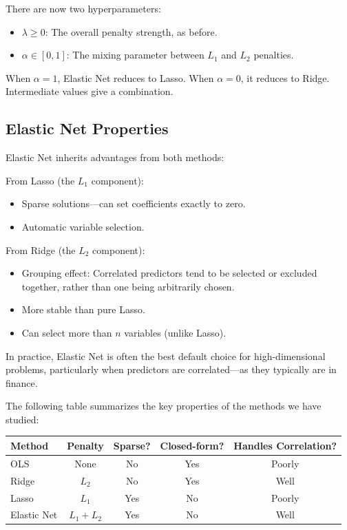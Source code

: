 \documentclass[11pt,a4paper]{article}
\begin{document}
There are now two hyperparameters:
\begin{itemize}
    \item $\lambda \geq 0$: The overall penalty strength, as before.
    \item $\alpha \in [0, 1]$: The mixing parameter between $L_1$ and $L_2$ penalties.
\end{itemize}

When $\alpha = 1$, Elastic Net reduces to Lasso. When $\alpha = 0$, it reduces to Ridge. Intermediate values give a combination.

\subsection{Elastic Net Properties}

Elastic Net inherits advantages from both methods:

From Lasso (the $L_1$ component):
\begin{itemize}
    \item Sparse solutions---can set coefficients exactly to zero.
    \item Automatic variable selection.
\end{itemize}

From Ridge (the $L_2$ component):
\begin{itemize}
    \item Grouping effect: Correlated predictors tend to be selected or excluded together, rather than one being arbitrarily chosen.
    \item More stable than pure Lasso.
    \item Can select more than $n$ variables (unlike Lasso).
\end{itemize}

In practice, Elastic Net is often the best default choice for high-dimensional problems, particularly when predictors are correlated---as they typically are in finance.

The following table summarizes the key properties of the methods we have studied:

\begin{center}
\begin{tabular}{lcccc}
\toprule
\textbf{Method} & \textbf{Penalty} & \textbf{Sparse?} & \textbf{Closed-form?} & \textbf{Handles Correlation?} \\
\midrule
OLS & None & No & Yes & Poorly \\
Ridge & $L_2$ & No & Yes & Well \\
Lasso & $L_1$ & Yes & No & Poorly \\
Elastic Net & $L_1 + L_2$ & Yes & No & Well \\
\bottomrule
\end{tabular}
\end{center}
\end{document}
